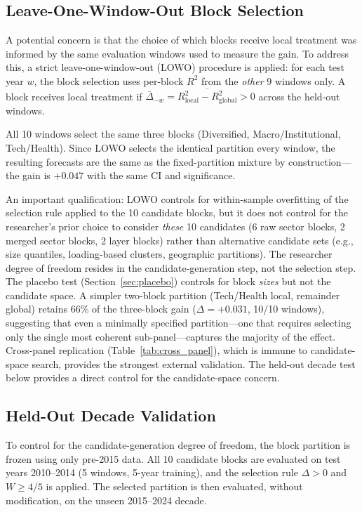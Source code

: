 \documentclass[11pt,a4paper]{article}
\begin{document}
\subsection{Leave-One-Window-Out Block Selection}

A potential concern is that the choice of which blocks receive local treatment was informed by the same evaluation windows used to measure the gain. To address this, a strict leave-one-window-out (LOWO) procedure is applied: for each test year $w$, the block selection uses per-block $R^2$ from the \emph{other} 9 windows only. A block receives local treatment if $\bar\Delta_{-w} = \overline{R^2_{\text{local}} - R^2_{\text{global}}} > 0$ across the held-out windows.

All 10 windows select the same three blocks (Diversified, Macro/Institutional, Tech/Health). Since LOWO selects the identical partition every window, the resulting forecasts are the same as the fixed-partition mixture by construction---the gain is $+0.047$ with the same CI and significance.

An important qualification: LOWO controls for within-sample overfitting of the selection rule applied to the 10 candidate blocks, but it does not control for the researcher's prior choice to consider \emph{these} 10 candidates (6 raw sector blocks, 2 merged sector blocks, 2 layer blocks) rather than alternative candidate sets (e.g., size quantiles, loading-based clusters, geographic partitions). The researcher degree of freedom resides in the candidate-generation step, not the selection step. The placebo test (Section~\ref{sec:placebo}) controls for block \emph{sizes} but not the candidate space. A simpler two-block partition (Tech/Health local, remainder global) retains 66\% of the three-block gain ($\Delta = +0.031$, 10/10 windows), suggesting that even a minimally specified partition---one that requires selecting only the single most coherent sub-panel---captures the majority of the effect. Cross-panel replication (Table~\ref{tab:cross_panel}), which is immune to candidate-space search, provides the strongest external validation. The held-out decade test below provides a direct control for the candidate-space concern.

\subsection{Held-Out Decade Validation}
\label{sec:held_out}

To control for the candidate-generation degree of freedom, the block partition is frozen using only pre-2015 data. All 10 candidate blocks are evaluated on test years 2010--2014 (5 windows, 5-year training), and the selection rule $\Delta > 0$ and $W \geq 4/5$ is applied. The selected partition is then evaluated, without modification, on the unseen 2015--2024 decade.
\end{document}
